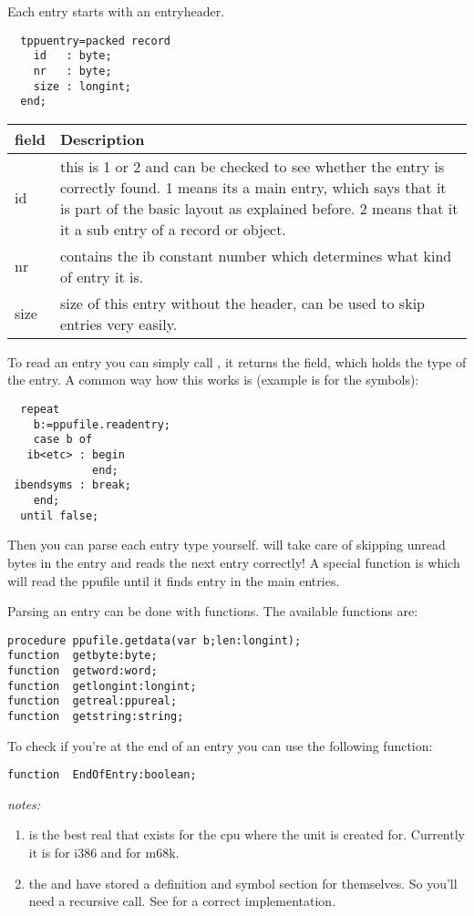 Each entry starts with an entryheader.
\begin{verbatim}
  tppuentry=packed record
    id   : byte;
    nr   : byte;
    size : longint;
  end;
\end{verbatim}

\begin{tabular}{lp{10cm}}
field & Description \\ \hline
id & this is 1 or 2 and can be checked to see whether the entry is correctly
found. 1 means its a main entry, which says that it is part of the
basic layout as explained before. 2 means that it it a sub entry
of a record or object. \\
nr & contains the ib constant number which determines what kind of
entry it is. \\
size & size of this entry without the header, can be used to skip entries
very easily. \\ \hline
\end{tabular}

To read an entry you can simply call ,
it returns the
 field, which holds the type of the entry.
A common way how this works is (example is for the symbols):

\begin{verbatim}
  repeat
    b:=ppufile.readentry;
    case b of
   ib<etc> : begin
             end;
 ibendsyms : break;
    end;
  until false;
\end{verbatim}

Then you can parse each entry type yourself.  will take
care of skipping unread bytes in the entry and reads the next entry
correctly! A special function is 
which will read the ppufile until it finds entry  in the main
entries.

Parsing an entry can be done with  functions. The
available functions are:
\begin{verbatim}
procedure ppufile.getdata(var b;len:longint);
function  getbyte:byte;
function  getword:word;
function  getlongint:longint;
function  getreal:ppureal;
function  getstring:string;
\end{verbatim}

To check if you're at the end of an entry you can use the following
function:

\begin{verbatim}
function  EndOfEntry:boolean;
\end{verbatim}
{\em notes:}
\begin{enumerate}
\item {} is the best real that exists for the cpu where the
unit is created for. Currently it is  for i386 and
 for m68k.
\item the  and  have stored a definition
and symbol section for themselves. So you'll need a recursive call. See
 for a correct implementation.
\end{enumerate}

